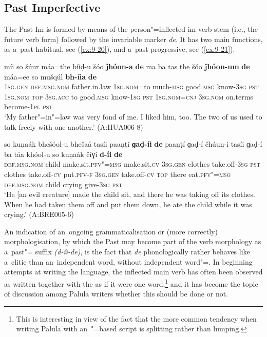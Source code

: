 \subsection{Past Imperfective}
\label{subsec:9-1-6}

The Past Im is formed by means of the person"=inflected im verb stem (i.e., the future verb form) followed by the invariable marker \textit{de}. It has two main functions, as a~past habitual, see (\ref{ex:9-20}), and a~past progressive, see (\ref{ex:9-21}).

\ea
\label{ex:9-20}
\gll míi so šúur máa=the bíiḍ-u šóo \textbf{ǰhóon-a} \textbf{de} ma ba tas the šóo \textbf{ǰhóon-um} \textbf{de} máa=ee so mušqúl \textbf{bh-íia} \textbf{de}\\
\textsc{1sg.gen} \textsc{def.msg.nom} father.in.law \textsc{1sg.nom=}to much-\textsc{msg} good.\textsc{msg} know-\textsc{3sg} \textsc{pst} \textsc{1sg.nom} \textsc{top} \textsc{3sg.acc}  to good.\textsc{msg} know-\textsc{1sg } \textsc{pst } \textsc{1sg.nom=cnj}  \textsc{3sg.nom} on.terms become-\textsc{1pl} \textsc{pst} \\
\glt `My father"=in"=law was very fond of me. I liked him, too. The two of us used to talk freely with one another.' (A:HUA006-8)

\ex
\label{ex:9-21}
\gll so kuṇaák bhešóol-u bhešaá tasíi paaṇṭí \textbf{ɡaḍ-íi} \textbf{de} paaṇṭí ɡaḍ-í čhúuṇ-i tasíi ɡaḍ-í ba táa khóol-u so kuṇaák číɣi \textbf{d-íi} \textbf{de} \\
\textsc{def.msg.nom} child make.sit.\textsc{pfv"=msg} make.sit.\textsc{cv} \textsc{3sg.gen}  clothes take.off-\textsc{3sg } \textsc{pst} clothes take.off-\textsc{cv} put.\textsc{pfv-f}  \textsc{3sg.gen} take.off-\textsc{cv} \textsc{top} there eat.\textsc{pfv"=msg}  \textsc{def.msg.nom} child crying give-\textsc{3sg} \textsc{pst} \\
\glt `He [an evil creature] made the child sit, and there he was taking off its clothes. When he had taken them off and put them down, he ate the child while it was crying.' (A:BRE005-6)
\z

An indication of an~ongoing grammaticalisation or (more correctly) morphologisation, by which the Past  may become part of the verb morphology as a~past"= suffix \textit{(d-íi-de)}, is the fact that \textit{de} phonologically rather behaves like a~clitic than an~independent word, without independent word"=. In beginning attempts at writing the language, the inflected main verb has often been observed as written together with the   as if it were one word,\footnote{This is interesting in view of the fact that the more common tendency when writing Palula with an~\iliArabic"=based script is splitting rather than lumping.} and it has become the topic of discussion among Palula writers whether this should be done or not. 


